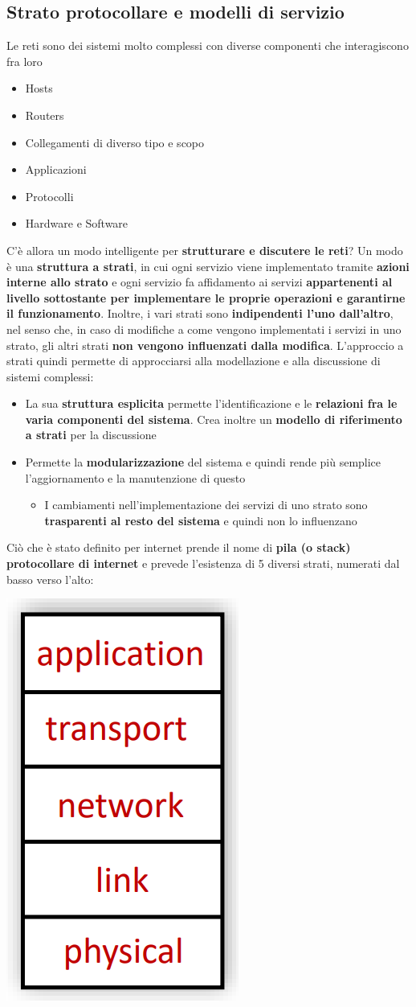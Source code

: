 \documentclass[12pt]{article}
\begin{document}
\subsection{Strato protocollare e modelli di servizio}
Le reti sono dei sistemi molto complessi con diverse componenti che interagiscono fra loro
\begin{itemize}
    \item Hosts
    \item Routers
    \item Collegamenti di diverso tipo e scopo
    \item Applicazioni
    \item Protocolli
    \item Hardware e Software
\end{itemize}
C'è allora un modo intelligente per \textbf{strutturare e discutere le reti}?
Un modo è una \textbf{struttura a strati}, in cui ogni servizio viene implementato tramite \textbf{azioni interne allo strato} e ogni servizio fa affidamento ai servizi \textbf{appartenenti al livello sottostante per implementare le proprie operazioni e garantirne il funzionamento}.
Inoltre, i vari strati sono \textbf{indipendenti l'uno dall'altro}, nel senso che, in caso di modifiche a come vengono implementati i servizi in uno strato, gli altri strati \textbf{non vengono influenzati dalla modifica}.
L'approccio a strati quindi permette di approcciarsi alla modellazione e alla discussione di sistemi complessi:
\begin{itemize}
    \item La sua \textbf{struttura esplicita} permette l'identificazione e le \textbf{relazioni fra le varia componenti del sistema}. Crea inoltre un \textbf{modello di riferimento a strati} per la discussione
    \item Permette la \textbf{modularizzazione} del sistema e quindi rende più semplice l'aggiornamento e la manutenzione di questo
    \begin{itemize}
        \item I cambiamenti nell'implementazione dei servizi di uno strato sono \textbf{trasparenti al resto del sistema} e quindi non lo influenzano
    \end{itemize}
\end{itemize}
Ciò che è stato definito per internet prende il nome di \textbf{pila (o stack) protocollare di internet} e prevede l'esistenza di 5 diversi strati, numerati dal basso verso l'alto:
\begin{center}
    \includegraphics[width =0.15\linewidth]{Images/24.PNG}
\end{center}
\end{document}

